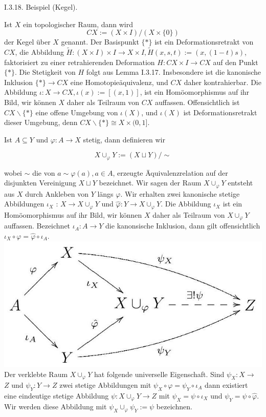 \documentclass[10pt, letterpaper]{article}
\begin{document}
I.3.18. Beispiel (Kegel). 


Ist $X$ ein topologischer Raum, dann wird
$$
C X:=(X \times I) /(X \times\{0\})
$$
der Kegel über $X$ genannt. Der Basispunkt $\{*\}$ ist ein Deformationsretrakt von $C X$, die Abbildung $\tilde{H}:(X \times I) \times I \rightarrow X \times I, \tilde{H}(x, s, t):=(x,(1-t) s)$, faktorisiert zu einer retrahierenden Deformation $H: C X \times I \rightarrow C X$ auf den Punkt $\{*\}$. Die Stetigkeit von $H$ folgt aus Lemma I.3.17. Insbesondere ist die kanonische Inklusion $\{*\} \rightarrow C X$ eine Homotopieäquivalenz, und $C X$ daher kontrahierbar. Die Abbildung $\iota: X \rightarrow C X, \iota(x):=[(x, 1)]$, ist ein Homöomorphismus auf ihr Bild, wir können $X$ daher als Teilraum von $C X$ auffassen. Offensichtlich ist $C X \backslash\{*\}$ eine offene Umgebung von $\iota(X)$, und $\iota(X)$ ist Deformationsretrakt dieser Umgebung, denn $C X \backslash\{*\} \cong X \times(0,1]$.

Ist $A \subseteq Y$ und $\varphi: A \rightarrow X$ stetig, dann definieren wir

$$
X \cup_{\varphi} Y:=(X \sqcup Y) / \sim
$$

wobei $\sim$ die von $a \sim \varphi(a), a \in A$, erzeugte Äquivalenzrelation auf der disjunkten Vereinigung $X \sqcup Y$ bezeichnet. Wir sagen der Raum $X \cup_{\varphi} Y$ entsteht aus $X$ durch Ankleben von $Y$ längs $\varphi$. Wir erhalten zwei kanonische stetige Abbildungen $\iota_{X}$ : $X \rightarrow X \cup_{\varphi} Y$ und $\hat{\varphi}: Y \rightarrow X \cup_{\varphi} Y$. Die Abbildung $\iota_{X}$ ist ein Homöomorphismus auf ihr Bild, wir können $X$ daher als Teilraum von $X \cup_{\varphi} Y$ auffassen. Bezeichnet $\iota_{A}: A \rightarrow Y$ die kanonsische Inklusion, dann gilt offensichtlich $\iota_{X} \circ \varphi=\hat{\varphi} \circ \iota_{A}$.\\
\includegraphics[max width=\textwidth]{2025_06_05_d7ed2bacd1e9ce1db1f0g-027} Der verklebte Raum $X \cup_{\varphi} Y$ hat folgende universelle Eigenschaft. Sind $\psi_{X}: X \rightarrow$ $Z$ und $\psi_{Y}: Y \rightarrow Z$ zwei stetige Abbildungen mit $\psi_{X} \circ \varphi=\psi_{Y} \circ \iota_{A}$ dann existiert eine eindeutige stetige Abbildung $\psi: X \cup_{\varphi} Y \rightarrow Z$ mit $\psi_{X}=\psi \circ \iota_{X}$ und $\psi_{Y}=\psi \circ \hat{\varphi}$. Wir werden diese Abbildung mit $\psi_{X} \cup_{\varphi} \psi_{Y}:=\psi$ bezeichnen.\\
\end{document}
